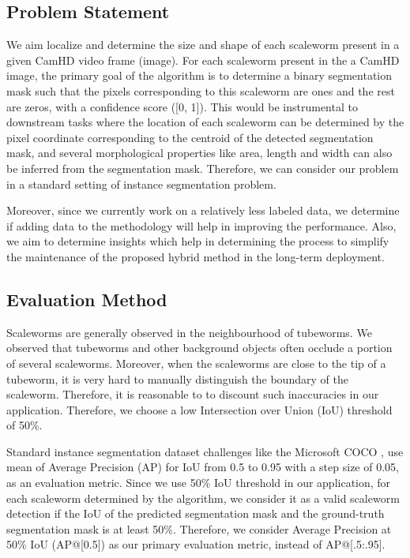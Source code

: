 \documentclass[10pt,twocolumn,letterpaper]{article}
\begin{document}
\subsection{Problem Statement}
We aim localize and determine the size and shape of each scaleworm present in a given CamHD video frame (image). For each scaleworm present in the a CamHD image, the primary goal of the algorithm is to determine a binary segmentation mask such that the pixels corresponding to this scaleworm are ones and the rest are zeros, with a confidence score ([0, 1]). This would be instrumental to downstream tasks where the location of each scaleworm can be determined by the pixel coordinate corresponding to the centroid of the detected segmentation mask, and several morphological properties like area, length and width can also be inferred from the segmentation mask. Therefore, we can consider our problem in a standard setting of instance segmentation problem.

Moreover, since we currently work on a relatively less labeled data, we determine if adding data to the methodology will help in improving the performance. Also, we aim to determine insights which help in determining the process to simplify the maintenance of the proposed hybrid method in the long-term deployment.

\subsection{Evaluation Method} \label{section:evalmethod}
Scaleworms are generally observed in the neighbourhood of tubeworms. We observed that tubeworms and other background objects often occlude a portion of several scaleworms. Moreover, when the scaleworms are close to the tip of a tubeworm, it is very hard to manually distinguish the boundary of the scaleworm. Therefore, it is reasonable to to discount such inaccuracies in our application. Therefore, we choose a low Intersection over Union (IoU) threshold of 50\%.

Standard instance segmentation dataset challenges like the Microsoft COCO \cite{cocodata}, use mean of Average Precision (AP) \cite{averageprecision} for IoU from 0.5 to 0.95 with a step size of 0.05, as an evaluation metric. Since we use 50\% IoU threshold in our application, for each scaleworm determined by the algorithm, we consider it as a valid scaleworm detection if the IoU of the predicted segmentation mask and the ground-truth segmentation mask is at least 50\%. Therefore, we consider Average Precision at 50\% IoU (AP@[0.5]) as our primary evaluation metric, instead of AP@[.5:.95].
\end{document}
